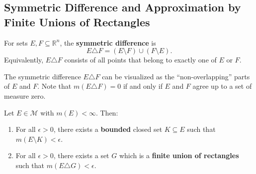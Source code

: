 \documentclass[11pt]{report}
\begin{document}
\subsection{Symmetric Difference and Approximation by Finite Unions of Rectangles}

\begin{defbox}
For sets $E, F \subseteq \mathbb{R}^n$, the \textbf{symmetric difference} is
\[
E \triangle F = (E \setminus F) \cup (F \setminus E).
\]
Equivalently, $E \triangle F$ consists of all points that belong to exactly one of $E$ or $F$.
\end{defbox}

\begin{rembox}
The symmetric difference $E \triangle F$ can be visualized as the ``non-overlapping'' parts of $E$ and $F$. Note that $m(E \triangle F) = 0$ if and only if $E$ and $F$ agree up to a set of measure zero.
\end{rembox}

\begin{thmbox}
Let $E \in \mathcal{M}$ with $m(E) < \infty$. Then:
\begin{enumerate}
    \item For all $\epsilon > 0$, there exists a \textbf{bounded} closed set $K \subseteq E$ such that $m(E \setminus K) < \epsilon$.
    \item For all $\epsilon > 0$, there exists a set $G$ which is a \textbf{finite union of rectangles} such that $m(E \triangle G) < \epsilon$.
\end{enumerate}
\end{thmbox}
\end{document}
